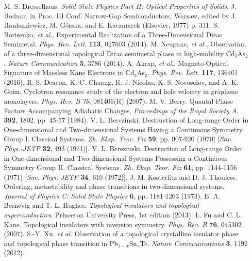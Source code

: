 \documentclass[titlepage,a4paper]{book}
\begin{document}
\begin{thebibliography}{199}
M. S. Dresselhaus. \textit{Solid State Physics Part II: Optical Properties of Solids}.
J. Bodnar, in Proc. III Conf. Narrow-Gap Semiconductors, Warsaw, edited by J. Raułszkiewicz, M. Górska, and E. Kaczmarek (Elsevier, 1977) p. 311.
S. Borisenko, \textit{et al.}, Experimental Realization of a Three-Dimensional Dirac Semimetal. \textit{Phys. Rev. Lett.} \textbf{113}, 027603 (2014).
M. Neupane, \textit{et al.}, Observation of a three-dimensional topological Dirac semimetal phase in high-mobility Cd$_3$As$_2$. \textit{Nature Communication} \textbf{5}, 3786 (2014).
A. Akrap, \textit{et al.}. Magneto-Optical Signature of Massless Kane Electrons in Cd$_3$As$_2$. \textit{Phys. Rev. Lett.} \textbf{117}, 136401 (2016). 
R. S. Deacon, K.-C. Chuang, R. J. Nicolas, K. S. Novoselov, and A. K. Geim, Cyclotron resonance study of the electron and hole velocity in graphene monolayers. \textit{Phys. Rev. B} \textit{76}, 081406(R) (2007).
M. V. Berry. Quantal Phase Factors Accompanying Adiabatic Changes. \textit{Proceedings of the Royal Society A.} \textbf{392}, 1802, pp. 45-57 (1984).
V. L. Berezinski. Destruction of Long-range Order in One-dimensional and Two-dimensional Systems Having a Continuous Symmetry Group I. Classical Systems. \textit{Zh. Eksp. Teor. Fiz} \textbf{59}, pp. 907-920 (1970) [\textit{Sov. Phys.-JETP} \textbf{32}, 493 (1971)].
V. L. Berezinski. Destruction of Long-range Order in One-dimensional and Two-dimensional Systems Possessing a Continuous Symmetry Group II. Classical Systems. \textit{Zh. Eksp. Teor. Fiz} \textbf{61}, pp. 1144-1156 (1971) [\textit{Sov. Phys.-JETP} \textbf{34}, 610 (1972)].
J. M. Kosterlitz and D. J. Thouless. Ordering, metastability and phase transitions in two-dimensional systems. \textit{Journal of Physics C: Solid State Physics} \textbf{6}, pp. 1181-1203 (1973).
B. A. Bernevig and T. L. Hughes. \textit{Topological insulators and topological superconductors}. Princeton University Press, 1st edition (2013).
L. Fu and C. L. Kane. Topological insulators with inversion symmetry. \textit{Phys. Rev. B} \textbf{76}, 045302 (2007).
S.-Y. Xu, \textit{et al.} Observation of a topological crystalline insulator phase and topological phase transition in Pb$_{1-x}$Sn$_{x}$Te. \textit{Nature Communications} \textbf{3}, 1192 (2012).

\end{thebibliography}
\end{document}
